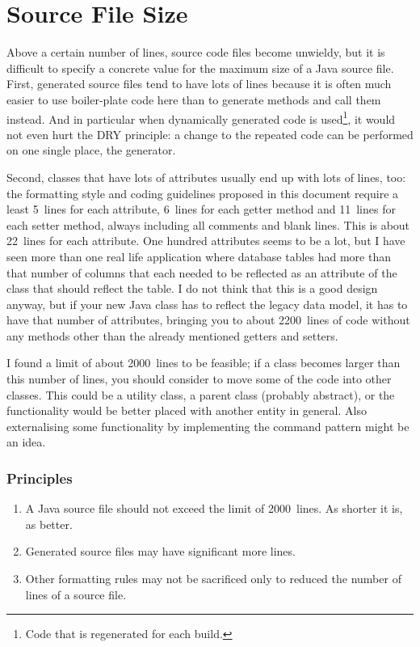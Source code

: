 \section{Source File Size}
Above a certain number of lines, source code files become unwieldy, but it is difficult to specify a concrete value for the maximum size of a Java source file. First, generated source files tend to have lots of lines because it is often much easier to use boiler-plate code here than to generate methods and call them instead. And in particular when dynamically generated code is used\footnote{Code that is regenerated for each build.}, it would not even hurt the DRY principle: a change to the repeated code can be performed on one single place, the generator.

Second, classes that have lots of attributes usually end up with lots of lines, too: the formatting style and coding guidelines proposed in this document require a least 5~lines for each attribute, 6~lines for each getter method and 11~lines for each setter method, always including all comments and blank lines. This is about 22~lines for each attribute.  One hundred attributes seems to be a lot, but I have seen more than one real life application where database tables had more than that number of columns that each needed to be reflected as an attribute of the class that should reflect the table. I do not think that this is a good design anyway, but if your new Java class has to reflect the legacy data model, it has to have that number of attributes, bringing you to about 2200~lines of code without any methods other than the already mentioned getters and setters.

I found a limit of about 2000~lines to be feasible; if a class becomes larger than this number of lines, you should consider to move some of the code into other classes. This could be a utility class, a parent class (probably abstract), or the functionality would be better placed with another entity in general. Also externalising some functionality by implementing the command pattern \autocite{Gamma:DesignPatterns} might be an idea. 

\subsubsection{Principles}
\begin{enumerate}[label=P\arabic*.]
\item{A Java source file should not exceed the limit of 2000~lines. As shorter it is, as better.}
\item{Generated source files may have significant more lines.}
\item{Other formatting rules may not be sacrificed only to reduced the number of lines of a source file.}
\end{enumerate}

